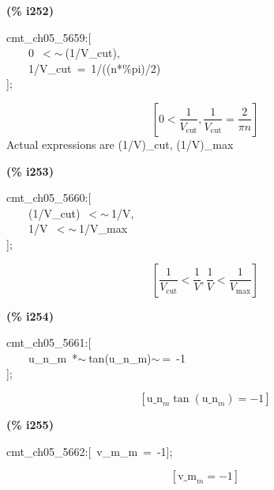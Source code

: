 \documentclass[fleqn]{article}
\begin{document}
\noindent
\begin{minipage}[t]{4.000000em}\color{red}\bfseries
(\% i252)	
\end{minipage}
\begin{minipage}[t]{\textwidth}\color{blue}
cmt\_ch05\_5659:[\\
\ \ \ \ 0\ \ensuremath{<}\ensuremath{\sim\ }(1/V\_cut),\\
\ \ \ \ 1/V\_cut\ =\ 1/((n*\%pi)/2)\\
];
\end{minipage}
\[\displaystyle \tag{\% o252} 
\left[ 0\operatorname{<  }\frac{1}{{V_{\ensuremath{\mathrm{cut}}}}}\operatorname{,}\frac{1}{{V_{\ensuremath{\mathrm{cut}}}}}=\frac{2}{\ensuremath{\pi}  n}\right] \mbox{}
\]
Actual expressions are (1/V)\_cut, (1/V)\_max


\noindent
\begin{minipage}[t]{4.000000em}\color{red}\bfseries
(\% i253)	
\end{minipage}
\begin{minipage}[t]{\textwidth}\color{blue}
cmt\_ch05\_5660:[\\
\ \ \ \ (1/V\_cut)\ \ensuremath{<}\ensuremath{\sim\ }1/V,\ \\
\ \ \ \ 1/V\ \ensuremath{<}\ensuremath{\sim\ }1/V\_max\\
];
\end{minipage}
\[\displaystyle \tag{\% o253} 
\left[ \frac{1}{{V_{\ensuremath{\mathrm{cut}}}}}\operatorname{<  }\frac{1}{V}\operatorname{,}\frac{1}{V}\operatorname{<  }\frac{1}{{V_{\ensuremath{\mathrm{max}}}}}\right] \mbox{}
\]


\noindent
\begin{minipage}[t]{4.000000em}\color{red}\bfseries
(\% i254)	
\end{minipage}
\begin{minipage}[t]{\textwidth}\color{blue}
cmt\_ch05\_5661:[\\
\ \ \ \ u\_n\_m\ *\ensuremath{\sim\ }tan(u\_n\_m)\ensuremath{\sim\ }=\ -1\\
];
\end{minipage}
\[\displaystyle \tag{\% o254} 
\left[ {{\ensuremath{\mathrm{u\_ n}}}_m} \tan{\left( {{\ensuremath{\mathrm{u\_ n}}}_m}\right) }=-1\right] \mbox{}
\]


\noindent
\begin{minipage}[t]{4.000000em}\color{red}\bfseries
(\% i255)	
\end{minipage}
\begin{minipage}[t]{\textwidth}\color{blue}
cmt\_ch05\_5662:[\ v\_m\_m\ =\ -1];
\end{minipage}
\[\displaystyle \tag{\% o255} 
\left[ {{\ensuremath{\mathrm{v\_ m}}}_m}=-1\right] \mbox{}
\]
\end{document}
